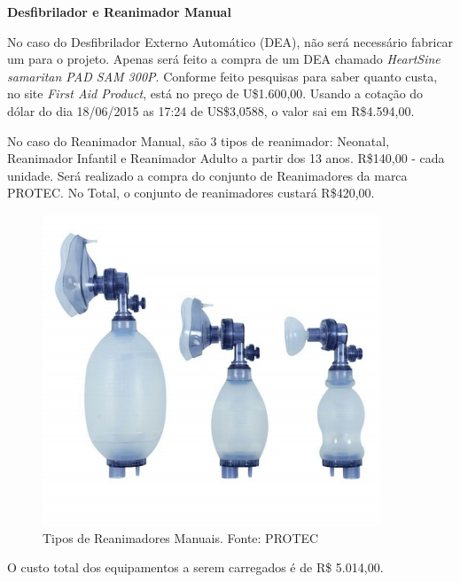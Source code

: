 \indent \textbf{Desfibrilador e Reanimador Manual}

No caso do Desfibrilador Externo Automático (DEA), não será necessário fabricar um
para o projeto. Apenas será feito a compra de um DEA chamado \textit{HeartSine samaritan PAD
SAM 300P}. Conforme feito pesquisas para saber quanto custa, no site \textit{First Aid Product}\footnotemark, está
no preço de U\$1.600,00. Usando a cotação do dólar do dia 18/06/2015 as 17:24 de
US\$3,0588, o valor sai em R\$4.594,00.

No caso do Reanimador Manual, são 3 tipos de reanimador: Neonatal, Reanimador Infantil e Reanimador Adulto a partir dos 13 anos. R\$140,00 - cada unidade\footnotemark. 
Será realizado a compra do conjunto de Reanimadores da marca PROTEC\footnotemark. No Total, o conjunto de reanimadores custará R\$420,00.

\begin{figure}[H]
    \centering
      \includegraphics[keepaspectratio=true,scale=0.4]{figuras/reanimadores.png}
    \caption{Tipos de Reanimadores Manuais. Fonte: PROTEC}
\end{figure}


O custo total dos equipamentos a serem carregados é de R\$ 5.014,00.
